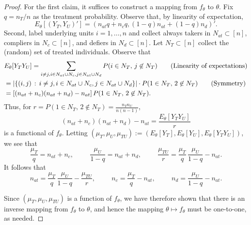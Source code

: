 \documentclass[12pt,reqno]{amsart}
\begin{document}
\propid*
\begin{proof}
For the first claim, it suffices to construct a mapping from $f_\theta$ to $\theta$. 
Fix $q = n_T/n$ as the treatment probability. 
    Observe that, by linearity of expectation, \[
        E_{\theta}[(Y_T, Y_U)'] = (n_{at} q + n_c q, (1-q) n_{at} + (1-q) n_d)'. 
    \]
    Second, label underlying units $i=1,\ldots,n$ and collect always takers in $N_{at}
    \subset [n]$, compliers in $N_c \subset [n]$, and defiers in $N_d \subset [n]$. Let
    $N_T \subset [n]$ collect the (random) set of treated individuals. 
    Observe that \begin{align*}
    &E_{\theta}[Y_TY_U] = \sum_{i \neq j, i\in N_{at} \cup N_c, j \in N_{at} \cup N_d} P
    (\text{$i \in N_T$, $j \not \in N_T$}) \tag{Linearity of expectations} \\
    &= |\{(i,j) \,:\, i \neq j, i\in N_{at} \cup N_c, j \in N_{at} \cup N_d \} | \cdot P
    (\text{$1 \in N_T$, $2 \not \in N_T$}) \tag{Symmetry}\\
    &= \left[{(n_{at} + n_c) (n_{at} + n_d) - n_{at}}\right] P
    (\text{$1 \in N_T$, $2 \not \in N_T$}).
    \end{align*}
    Thus,
    for $r = P
    (\text{$1 \in N_T$, $2 \not \in N_T$}) = \tfrac{n_T n_U}{n (n-1)}$,
    \[
        (n_{at} + n_c)(n_{at} + n_d) - n_{at} = \frac{E_{\theta}[Y_T Y_U]}{r} 
    \]
    is a functional of $f_\theta$. Letting $(\mu_T,\mu_U, \mu_{TU}) := (E_\theta[ Y_T] , E_\theta[Y_U], E_\theta[Y_T Y_U])$, we see that 
\begin{equation*}
    \frac{\mu_T}{q} = n_{at} + n_c, \hspace{1cm} \frac{\mu_U}{1-q} = n_{at} + n_d, \hspace{1cm} \frac{\mu_{TU}}{r} = \frac{\mu_T}{q}\,\frac{\mu_U}{1-q} - n_{at}.
\end{equation*}
It follows that
\begin{equation*}
    n_{at} = \frac{\mu_T}{q}\,\frac{\mu_U}{1-q} - \frac{\mu_{TU}}{r},  \hspace{1cm } n_c = \frac{\mu_T}{q} - n_{at}, \hspace{1cm} n_d = \frac{\mu_U}{1-q} - n_{at}.
\end{equation*}

\noindent Since $(\mu_T,\mu_U, \mu_{TU})$ is a function of $f_\theta$, we have therefore shown that there is an inverse mapping from $f_\theta$ to $\theta$, and hence the mapping $\theta \mapsto f_{\theta}$ must be one-to-one, as needed. 


\end{proof}
\end{document}
